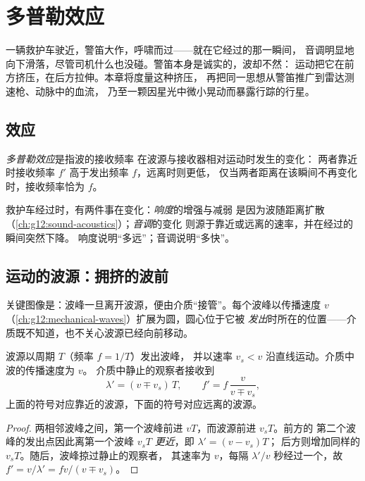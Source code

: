 \chapter{多普勒效应}\label{ch:g12:doppler-effect}

一辆救护车驶近，警笛大作，呼啸而过——就在它经过的那一瞬间，
音调明显地向下滑落，尽管司机什么也没碰。警笛本身是诚实的，波却不然：
运动把它在前方挤压，在后方拉伸。本章将度量这种挤压，
再把同一思想从警笛推广到雷达测速枪、动脉中的血流，
乃至一颗因星光中微小晃动而暴露行踪的行星。

\section{效应}

\begin{definition}[多普勒效应]\label{def:g12:doppler-effect:doppler}
\emph{多普勒效应}是指波的接收频率
在波源与接收器相对运动时发生的变化：
两者靠近时接收频率 $f'$ 高于发出频率 $f$，远离时则更低，
仅当两者距离在该瞬间不再变化时，接收频率恰为 $f$。
\end{definition}

\begin{remark}[音调而非响度]\label{rem:g12:doppler-effect:pitch}
救护车经过时，有两件事在变化：\emph{响度}的增强与减弱
是因为波随距离扩散（\cref{ch:g12:sound-acoustics}）；\emph{音调}的变化
则源于靠近或远离的速率，并在经过的瞬间突然下降。
响度说明“多远”；音调说明“多快”。
\end{remark}

\section{运动的波源：拥挤的波前}

关键图像是：波峰一旦离开波源，便由介质“接管”。每个波峰以传播速度 $v$
（\cref{ch:g12:mechanical-waves}）扩展为圆，圆心位于它被
\emph{发出}时所在的位置——介质既不知道，也不关心波源已经向前移动。

\begin{proposition}[运动的波源]\label{prop:g12:doppler-effect:moving-source}
波源以周期 $T$（频率 $f = 1/T$）发出波峰，
并以速率 $v_s < v$ 沿直线运动。介质中波的传播速度为 $v$。
介质中静止的观察者接收到
\[
\lambda' = (v \mp v_s)\,T, \qquad f' = f\,\frac{v}{v \mp v_s},
\]
上面的符号对应靠近的波源，下面的符号对应远离的波源。
\end{proposition}

\begin{proof}
两相邻波峰之间，第一个波峰前进 $vT$，而波源前进 $v_s T$。前方的
第二个波峰的发出点因此离第一个波峰 $v_s T$ \emph{更近}，即 $\lambda' = (v - v_s)T$；
后方则增加同样的 $v_s T$。随后，波峰掠过静止的观察者，
其速率为 $v$，每隔 $\lambda'/v$ 秒经过一个，故 $f' = v/\lambda' = f v/(v \mp v_s)$。
\end{proof}

